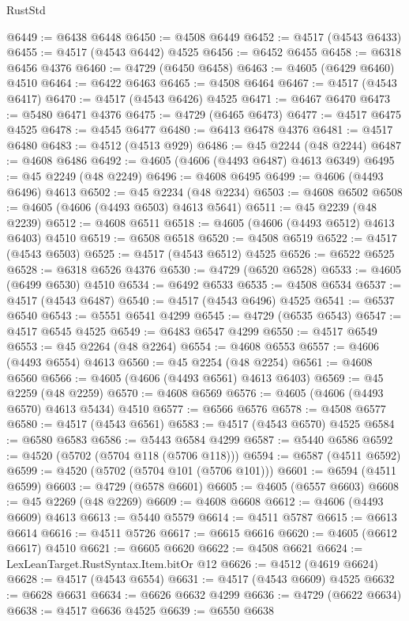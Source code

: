 \begin{lexlean}{RustStd}
\begin{coremodule}
@6449 := @6438 @6448
@6450 := @4508 @6449
@6452 := @4517 (@4543 @6433)
@6455 := @4517 (@4543 @6442) @4525
@6456 := @6452 @6455
@6458 := @6318 @6456 @4376
@6460 := @4729 (@6450 @6458)
@6463 := @4605 (@6429 @6460) @4510
@6464 := @6422 @6463
@6465 := @4508 @6464
@6467 := @4517 (@4543 @6417)
@6470 := @4517 (@4543 @6426) @4525
@6471 := @6467 @6470
@6473 := @5480 @6471 @4376
@6475 := @4729 (@6465 @6473)
@6477 := @4517 @6475 @4525
@6478 := @4545 @6477
@6480 := @6413 @6478 @4376
@6481 := @4517 @6480
@6483 := @4512 (@4513 @929)
@6486 := @45 @2244 (@48 @2244)
@6487 := @4608 @6486
@6492 := @4605 (@4606 (@4493 @6487) @4613 @6349)
@6495 := @45 @2249 (@48 @2249)
@6496 := @4608 @6495
@6499 := @4606 (@4493 @6496) @4613
@6502 := @45 @2234 (@48 @2234)
@6503 := @4608 @6502
@6508 := @4605 (@4606 (@4493 @6503) @4613 @5641)
@6511 := @45 @2239 (@48 @2239)
@6512 := @4608 @6511
@6518 := @4605 (@4606 (@4493 @6512) @4613 @6403) @4510
@6519 := @6508 @6518
@6520 := @4508 @6519
@6522 := @4517 (@4543 @6503)
@6525 := @4517 (@4543 @6512) @4525
@6526 := @6522 @6525
@6528 := @6318 @6526 @4376
@6530 := @4729 (@6520 @6528)
@6533 := @4605 (@6499 @6530) @4510
@6534 := @6492 @6533
@6535 := @4508 @6534
@6537 := @4517 (@4543 @6487)
@6540 := @4517 (@4543 @6496) @4525
@6541 := @6537 @6540
@6543 := @5551 @6541 @4299
@6545 := @4729 (@6535 @6543)
@6547 := @4517 @6545 @4525
@6549 := @6483 @6547 @4299
@6550 := @4517 @6549
@6553 := @45 @2264 (@48 @2264)
@6554 := @4608 @6553
@6557 := @4606 (@4493 @6554) @4613
@6560 := @45 @2254 (@48 @2254)
@6561 := @4608 @6560
@6566 := @4605 (@4606 (@4493 @6561) @4613 @6403)
@6569 := @45 @2259 (@48 @2259)
@6570 := @4608 @6569
@6576 := @4605 (@4606 (@4493 @6570) @4613 @5434) @4510
@6577 := @6566 @6576
@6578 := @4508 @6577
@6580 := @4517 (@4543 @6561)
@6583 := @4517 (@4543 @6570) @4525
@6584 := @6580 @6583
@6586 := @5443 @6584 @4299
@6587 := @5440 @6586
@6592 := @4520 (@5702 (@5704 @118 (@5706 @118)))
@6594 := @6587 (@4511 @6592)
@6599 := @4520 (@5702 (@5704 @101 (@5706 @101)))
@6601 := @6594 (@4511 @6599)
@6603 := @4729 (@6578 @6601)
@6605 := @4605 (@6557 @6603)
@6608 := @45 @2269 (@48 @2269)
@6609 := @4608 @6608
@6612 := @4606 (@4493 @6609) @4613
@6613 := @5440 @5579
@6614 := @4511 @5787
@6615 := @6613 @6614
@6616 := @4511 @5726
@6617 := @6615 @6616
@6620 := @4605 (@6612 @6617) @4510
@6621 := @6605 @6620
@6622 := @4508 @6621
@6624 := LexLeanTarget.RustSyntax.Item.bitOr @12
@6626 := @4512 (@4619 @6624)
@6628 := @4517 (@4543 @6554)
@6631 := @4517 (@4543 @6609) @4525
@6632 := @6628 @6631
@6634 := @6626 @6632 @4299
@6636 := @4729 (@6622 @6634)
@6638 := @4517 @6636 @4525
@6639 := @6550 @6638

\end{coremodule}
\end{lexlean}
